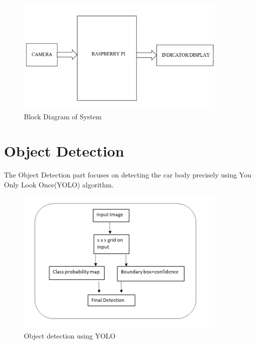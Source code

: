 \begin{figure}[tbh] %
\begin{center}
	\includegraphics[width = 4in]{images/block diagram of system.jpg}
	\caption{Block Diagram of System} %
	\label{figObjectDetectionusingYOLO} %
\end{center}
\end{figure}



\section{Object Detection}
The Object Detection part focuses on detecting the car body precisely using You Only Look Once(YOLO) algorithm. \\

\begin{figure}[tbh] %
\begin{center}
	\includegraphics[width = 4in]{images/yolo.png}
	\caption{Object detection using YOLO} %
	\label{figObjectDetectionusingYOLO} %
\end{center}
\end{figure}

